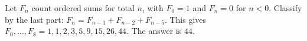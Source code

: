 Let $F_n$ count ordered sums for total $n$, with $F_0=1$ and $F_n=0$ for $n<0$. Classify by the last part: $F_n=F_{n-1}+F_{n-2}+F_{n-5}$. This gives $F_0,\ldots,F_8=1,1,2,3,5,9,15,26,44$. The answer is $\boxed{44}$.
